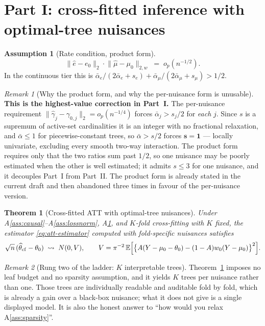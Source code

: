 \documentclass[11pt]{article}
\theoremstyle{plain}
\newtheorem{theorem}{Theorem}
\theoremstyle{definition}
\newtheorem{assumption}{Assumption}
\theoremstyle{remark}
\newtheorem{remark}{Remark}
\newcommand{\E}{\mathbb{E}}
\newcommand{\ez}{e_0}
\newcommand{\mz}{\mu_0}
\newcommand{\wz}{w_0}
\newcommand{\ehat}{\widehat{e}}
\newcommand{\mhat}{\widehat{\mu}}
\newcommand{\thetahat}{\widehat{\theta}}
\newcommand{\Ltwo}[1]{\lVert #1 \rVert_{2}}
\newcommand{\Lw}[1]{\lVert #1 \rVert_{2,w}}
\begin{document}
\section{Part I: cross-fitted inference with optimal-tree nuisances}

\begin{assumption}[Rate condition, product form]\label{ass:rate}
\[
  \Ltwo{\ehat-\ez}\cdot\Lw{\mhat-\mz}\;=\;o_p(n^{-1/2}).
\]
In the continuous tier this is
$\bar\alpha_e/(2\bar\alpha_e+s_e)+\bar\alpha_\mu/(2\bar\alpha_\mu+s_\mu)>1/2$.
\end{assumption}

\begin{remark}[Why the product form, and why the per-nuisance form is unusable]
\label{rem:product}
\textbf{This is the highest-value correction in Part~I.} The per-nuisance
requirement $\Ltwo{\widehat\gamma_j-\gamma_{0,j}}=o_p(n^{-1/4})$ forces
$\bar\alpha_j>s_j/2$ for \emph{each} $j$. Since $s$ is a supremum of active-set
cardinalities it is an integer with no fractional relaxation, and
$\bar\alpha\le1$ for piecewise-constant trees, so $\bar\alpha>s/2$ forces
$\boldsymbol{s=1}$ --- locally univariate, excluding every smooth two-way
interaction. The product form requires only that the two ratios sum past
$1/2$, so one nuisance may be poorly estimated when the other is well estimated;
it admits $s\le3$ for one nuisance, and it decouples Part~I from Part~II. The
product form is already stated in the current draft and then abandoned three
times in favour of the per-nuisance version.
\end{remark}

\begin{theorem}[Cross-fitted ATT with optimal-tree nuisances]\label{thm:crossfit}
Under A\ref{ass:causal}--A\ref{ass:lossnorm}, A\ref{ass:rate}, and $K$-fold
cross-fitting with $K$ fixed, the estimator \eqref{eq:att-estimator} computed
with fold-specific nuisances satisfies
\[
  \sqrt n\,(\thetahat_{\mathrm{cf}}-\theta_0)\;\rightsquigarrow\;N(0,V),
  \qquad
  V=\pi^{-2}\,\E\Bigl[\bigl\{A(Y-\mz-\theta_0)-(1-A)\wz(Y-\mz)\bigr\}^2\Bigr].
\]
\end{theorem}

\begin{remark}[Rung two of the ladder: $K$ interpretable trees]
Theorem~\ref{thm:crossfit} imposes no leaf budget and no sparsity assumption, and
it yields $K$ trees per nuisance rather than one. Those trees are individually
readable and auditable fold by fold, which is already a gain over a black-box
nuisance; what it does not give is a single displayed model. It is also the
honest answer to ``how would you relax A\ref{ass:sparsity}''.
\end{remark}
\end{document}
